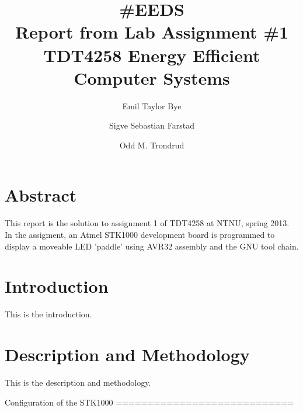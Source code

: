 \documentclass{article}
\begin{document}

\title{\#EEDS\\Report from Lab Assignment \#1\\TDT4258 Energy Efficient Computer Systems}
\author{Emil Taylor Bye}
\author{Sigve Sebastian Farstad}
\author{Odd M. Trondrud}
\maketitle

\newpage

\setcounter{secnumdepth}{-1}


\part{Abstract}

This report is the solution to assignment 1 of TDT4258 at NTNU, spring 2013.
In the assigment, an Atmel STK1000 development board is programmed to display a moveable LED 'paddle' using AVR32 assembly and the GNU tool chain.

\part{Introduction}

This is the introduction.

\part{Description and Methodology}

This is the description and methodology.

Configuration of the STK1000
============================
\end{document}
